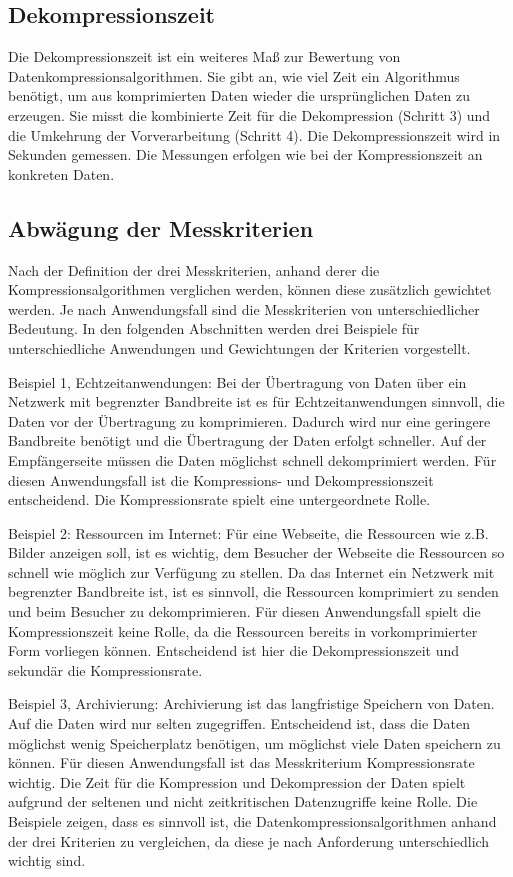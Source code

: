 \documentclass[conference]{IEEEtran}
\begin{document}
\subsection{Dekompressionszeit}

Die Dekompressionszeit ist ein weiteres Maß zur Bewertung von 
Datenkompressionsalgorithmen. 
Sie gibt an, wie viel Zeit ein Algorithmus benötigt, um aus komprimierten Daten 
wieder die ursprünglichen Daten zu erzeugen. 
Sie misst die kombinierte Zeit für die Dekompression (Schritt 3) und die Umkehrung 
der Vorverarbeitung (Schritt 4). Die Dekompressionszeit wird in Sekunden gemessen. 
Die Messungen erfolgen wie bei der Kompressionszeit an konkreten Daten.


\subsection{Abwägung der Messkriterien}

Nach der Definition der drei Messkriterien, anhand derer die Kompressionsalgorithmen 
verglichen werden, können diese zusätzlich gewichtet werden. 
Je nach Anwendungsfall sind die Messkriterien von unterschiedlicher Bedeutung. 
In den folgenden Abschnitten werden drei Beispiele für unterschiedliche Anwendungen 
und Gewichtungen der Kriterien vorgestellt.

Beispiel 1, Echtzeitanwendungen:
Bei der Übertragung von Daten über ein Netzwerk mit begrenzter Bandbreite ist es für 
Echtzeitanwendungen sinnvoll, die Daten vor der Übertragung zu komprimieren.
Dadurch wird nur eine geringere Bandbreite benötigt und die Übertragung der
Daten erfolgt schneller.
Auf der Empfängerseite müssen die Daten möglichst schnell dekomprimiert werden.
Für diesen Anwendungsfall ist die Kompressions- und Dekompressionszeit entscheidend.
Die Kompressionsrate spielt eine untergeordnete Rolle.

Beispiel 2: Ressourcen im Internet: 
Für eine Webseite, die Ressourcen wie z.B. Bilder anzeigen soll, ist es 
wichtig, dem Besucher der Webseite die Ressourcen so schnell wie möglich zur 
Verfügung zu stellen. 
Da das Internet ein Netzwerk mit begrenzter Bandbreite ist, ist es sinnvoll, die 
Ressourcen komprimiert zu senden und beim Besucher zu dekomprimieren. 
Für diesen Anwendungsfall spielt die Kompressionszeit keine Rolle, da die Ressourcen 
bereits in vorkomprimierter Form vorliegen können. 
Entscheidend ist hier die Dekompressionszeit und sekundär die Kompressionsrate.

Beispiel 3, Archivierung:
Archivierung ist das langfristige Speichern von Daten.
Auf die Daten wird nur selten zugegriffen.
Entscheidend ist, dass die Daten möglichst wenig Speicherplatz benötigen,
um möglichst viele Daten speichern zu können.
Für diesen Anwendungsfall ist das Messkriterium Kompressionsrate wichtig.
Die Zeit für die Kompression und Dekompression der Daten spielt aufgrund der 
seltenen und nicht zeitkritischen Datenzugriffe keine Rolle.
Die Beispiele zeigen, dass es sinnvoll ist, die Datenkompressionsalgorithmen 
anhand der drei Kriterien zu vergleichen, da diese je nach Anforderung unterschiedlich 
wichtig sind.
\end{document}
